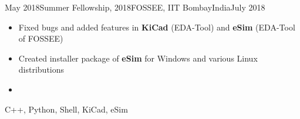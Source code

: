 
\begin{experiences}
  \experience
    {May 2018}{Summer Fellowship, 2018}{FOSSEE, IIT Bombay}{India}{July 2018} 
    {
        \begin{itemize}
            \item Fixed bugs and added features in \textbf{KiCad} (EDA-Tool) and \textbf{eSim} (EDA-Tool of FOSSEE)
            \item Created installer package of \textbf{eSim} for Windows and various Linux distributions
            \item {}
        \end{itemize}
    }
    {C++, Python, Shell, KiCad, eSim}
  \emptySeparator
\end{experiences}

